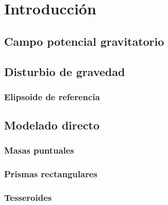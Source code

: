 \chapter{Introducción}


\section{Campo potencial gravitatorio}

\section{Disturbio de gravedad}

\subsection{Elipsoide de referencia}

\section{Modelado directo}

\subsection{Masas puntuales}

\subsection{Prismas rectangulares}

\subsection{Tesseroides}
